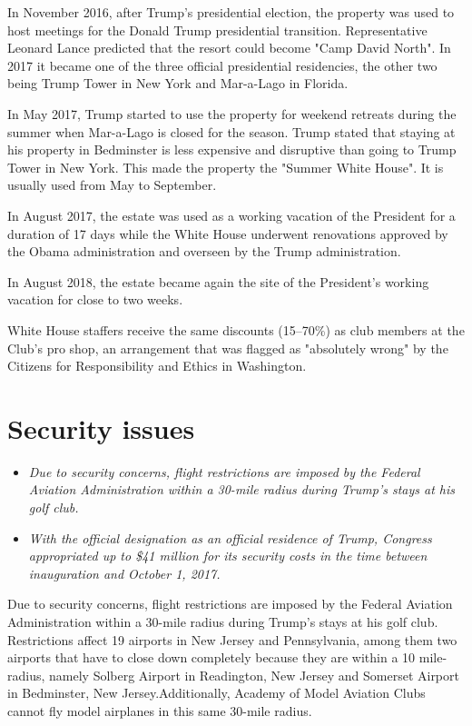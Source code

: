 In November 2016, after Trump's presidential election, the property was
used to host meetings for the Donald Trump presidential transition.
Representative Leonard Lance predicted that the resort could become
"Camp David North". In 2017 it became one of the three official
presidential residencies, the other two being Trump Tower in New York
and Mar-a-Lago in Florida.

In May 2017, Trump started to use the property for weekend retreats
during the summer when Mar-a-Lago is closed for the season. Trump stated
that staying at his property in Bedminster is less expensive and
disruptive than going to Trump Tower in New York. This made the property
the "Summer White House". It is usually used from May to September.

In August 2017, the estate was used as a working vacation of the
President for a duration of 17 days while the White House underwent
renovations approved by the Obama administration and overseen by the
Trump administration.

In August 2018, the estate became again the site of the President's
working vacation for close to two weeks.

White House staffers receive the same discounts (15--70\%) as club
members at the Club's pro shop, an arrangement that was flagged as
"absolutely wrong" by the Citizens for Responsibility and Ethics in
Washington.

\section{Security issues}\label{security-issues}

\begin{itemize}
\item
  \emph{Due to security concerns, flight restrictions are imposed by the
  Federal Aviation Administration within a 30-mile radius during Trump's
  stays at his golf club.}
\item
  \emph{With the official designation as an official residence of Trump,
  Congress appropriated up to \$41 million for its security costs in the
  time between inauguration and October 1, 2017.}
\end{itemize}

Due to security concerns, flight restrictions are imposed by the Federal
Aviation Administration within a 30-mile radius during Trump's stays at
his golf club. Restrictions affect 19 airports in New Jersey and
Pennsylvania, among them two airports that have to close down completely
because they are within a 10 mile-radius, namely Solberg Airport in
Readington, New Jersey and Somerset Airport in Bedminster, New
Jersey.Additionally, Academy of Model Aviation Clubs cannot fly model
airplanes in this same 30-mile radius.

